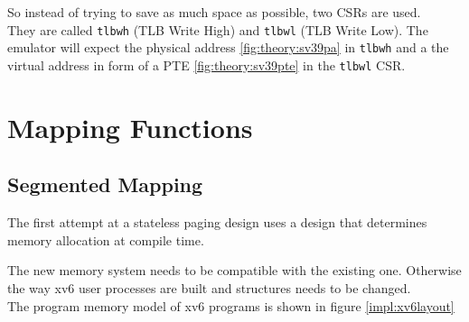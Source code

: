 So instead of trying to save as much space as possible, two CSRs are used.\\
They are called \texttt{tlbwh} (TLB Write High) and \texttt{tlbwl} (TLB Write Low).
The emulator will expect the physical address \ref{fig:theory:sv39pa} in \texttt{tlbwh} and a the virtual address in form
of a PTE \ref{fig:theory:sv39pte} in the \texttt{tlbwl} CSR.








\section{Mapping Functions}
\subsection{Segmented Mapping}

\cite{tanenbaumOS}
The first attempt at a stateless  paging design
uses a design that determines memory allocation at compile time.





The new memory system needs to be compatible with the existing one. Otherwise the way xv6
user processes are built and structures needs to be changed.\\
The program memory model of xv6 programs is shown in figure \ref{impl:xv6layout}

